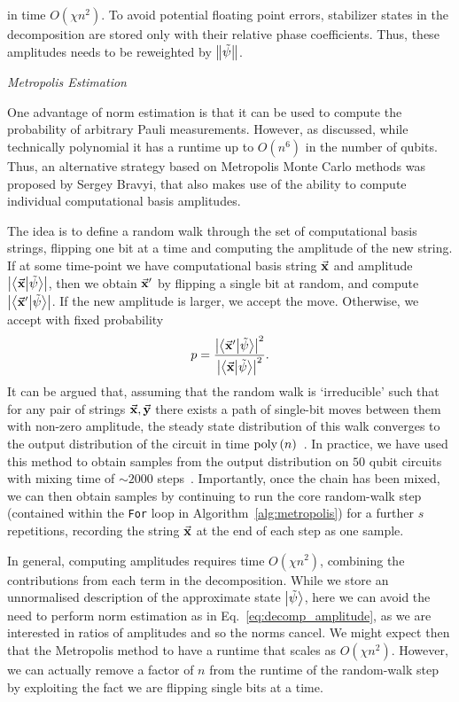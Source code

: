 in time $O(\chi n^{2})$. To avoid potential floating point errors, stabilizer states in the decomposition are stored only with their relative phase coefficients. Thus, these amplitudes needs to be reweighted by $\norm{\tilde{\psi}}$.\par
\large{\itshape{Metropolis Estimation}}\par
One advantage of norm estimation is that it can be used to compute the probability of arbitrary Pauli measurements. However, as discussed, while technically polynomial it has a runtime up to $O(n^{6})$ in the number of qubits. Thus, an alternative strategy based on Metropolis Monte Carlo methods was proposed by Sergey Bravyi, that also makes use of the ability to compute individual computational basis amplitudes.\par
The idea is to define a random walk through the set of computational basis strings, flipping one bit at a time and computing the amplitude of the new string. If at some time-point we have computational basis string $\va{x}$ and amplitude $\left|\braket{\va{x}}{\tilde{\psi}}\right|$, then we obtain $\va{x}'$ by flipping a single bit at random, and compute $\left|\braket{\va{x}'}{\tilde{\psi}}\right|$. If the new amplitude is larger, we accept the move. Otherwise, we accept with fixed probability
\[p = \frac{\left|\braket{\va{x}'}{\tilde{\psi}}\right|^{2}}{\left|\braket{\va{x}}{\tilde{\psi}}\right|^{2}}.\]
It can be argued that, assuming that the random walk is `irreducible' such that for any pair of strings $\va{x}, \va{y}$ there exists a path of single-bit moves between them with non-zero amplitude, the steady state distribution of this walk converges to the output distribution of the circuit in time $\text{poly}\left({n}\right)$~\cite{Bravyi2018}. In practice, we have used this method to obtain samples from the output distribution on $50$ qubit circuits with mixing time of $\sim 2000$ steps~\cite{Bravyi2018}. Importantly, once the chain has been mixed, we can then obtain samples by continuing to run the core random-walk step (contained within the \texttt{For} loop in Algorithm~\ref{alg:metropolis}) for a further $s$ repetitions, recording the string $\va{x}$ at the end of each step as one sample.\par
In general, computing amplitudes requires time $O\left(\chi n^{2}\right)$, combining the contributions from each term in the decomposition. While we store an unnormalised description of the approximate state $\ket{\tilde{\psi}}$, here we can avoid the need to perform norm estimation as in Eq.~\ref{eq:decomp_amplitude}, as we are interested in ratios of amplitudes and so the norms cancel. We might expect then that the Metropolis method to have a runtime that scales as $O\left(\chi n^{2}\right)$. However, we can actually remove a factor of $n$ from the runtime of the random-walk step by exploiting the fact we are flipping single bits at a time.\par
